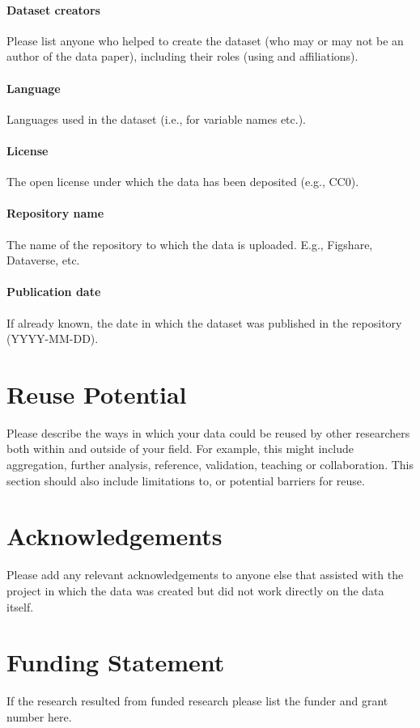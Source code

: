 \documentclass{article}
\begin{document}
\paragraph{Dataset creators} Please list anyone who helped to create the dataset (who may or may not be an author of the data paper), including their roles (using and affiliations).
\paragraph{Language} Languages used in the dataset (i.e., for variable names etc.).
\paragraph{License} The open license under which the data has been deposited (e.g., CC0). 
\paragraph{Repository name} The name of the repository to which the data is uploaded. E.g., Figshare, Dataverse, etc. 
\paragraph{Publication date} If already known, the date in which the dataset was published in the repository (YYYY-MM-DD).

\section{Reuse Potential}
Please describe the ways in which your data could be reused by other researchers both within and outside of your field. For example, this might include aggregation, further analysis, reference, validation, teaching or collaboration. This section should also include limitations to, or potential barriers for reuse.

\section*{Acknowledgements}
Please add any relevant acknowledgements to anyone else that assisted with the project in which the data was created but did not work directly on the data itself.

\section*{Funding Statement}
If the research resulted from funded research please list the funder and grant number here.
\end{document}
